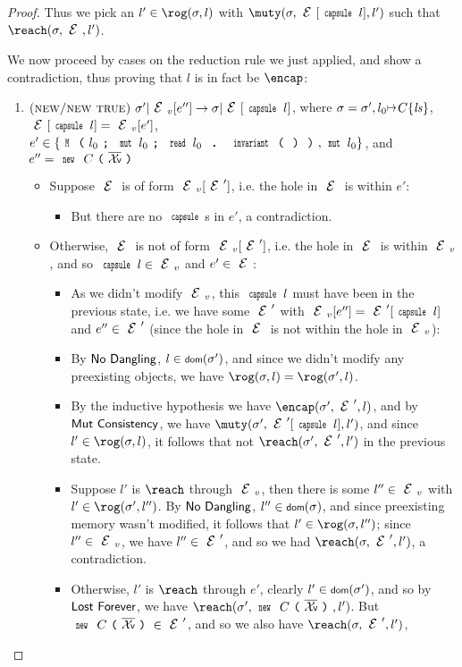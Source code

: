 \begin{proof}
	Thus we pick an $l'\in\rog(\s,l)$ with $\muty(\s,\E[\Kw{capsule}\,l],l')$
	such that $\reach(\s,\E,l')$.
	
	We now proceed by cases on the reduction rule we just applied, and
	show a contradiction, thus proving that $l$ is in fact be $\encap$:
	\begin{enumerate}
		\item $\crule{new/new true}{\s'}{\EV[e'']}{\s}{\E[\Kw{capsule}\,l]}$, where
		$\s = \s',l_0\mapsto C\{\ls\}$, $\E[\Kw{capsule}\,l] = \EV[e']$, $e'\in\{\M{l_0}{\Kw{mut}\,l_0}{\invariant{l_0}},\Kw{mut}\,l_0\}$,
		and $e'' = \new C{\vs}$
		\begin{itemize}
			\item Suppose $\E$ is of form $\EV[\E']$, i.e. the hole in $\E$ is within
			$e'$:
			\begin{itemize}
				\item But there are no $\Kw{capsule}$s in $e'$, a contradiction.
			\end{itemize}
			\item Otherwise, $\E$ is not of form $\EV[\E']$, i.e. the hole in $\E$
			is within $\EV$, and so $\Kw{capsule}\,l\in\EV$ and $e'\in\E$:
			\begin{itemize}
				\item As we didn't modify $\EV$, this $\Kw{capsule}\,l$ must have been in the
				previous state, i.e. we have some $\E'$ with $\EV[e''] = \E'[\Kw{capsule}\,l]$
				and $e''\in\E'$ (since the hole in $\E$ is not within the hole
				in $\EV$):
				\item By $\textsf{No Dangling}$, $l\in\dom(\s')$, and since we didn't
				modify any preexisting objects, we have $\rog(\s,l) = \rog(\s',l)$.
				\item By the inductive hypothesis we have $\encap(\s',\E',l)$, and by $\textsf{Mut Consistency}$,
				we have $\muty(\s',\E'[\Kw{capsule}\,l],l')$, and since $l'\in\rog(\s,l)$,
				it follows that not $\reach(\s',\E',l')$ in the previous state.
				\item Suppose $l'$ is $\reach$ through $\EV$, then there is some $l''\in\EV$
				with $l'\in\rog(\s',l'')$. By $\textsf{No Dangling}$, $l''\in\dom(\s)$,
				and since preexisting memory wasn't modified, it follows that $l'\in\rog(\s,l'')$;
				since $l''\in\EV$, we have $l''\in\E'$, and so we had $\reach(\s,\E',l')$,
				a contradiction.
				\item Otherwise, $l'$ is $\reach$ through $e'$, clearly $l'\in\dom(\s')$,
				and so by $\textsf{Lost Forever}$, we have $\reach(\s',\new C{\vs},l')$.
				But $\new C{\vs}\in\E'$, and so we also have $\reach(\s,\E',l')$,

\end{itemize}
\end{itemize}
\end{enumerate}
\end{proof}
